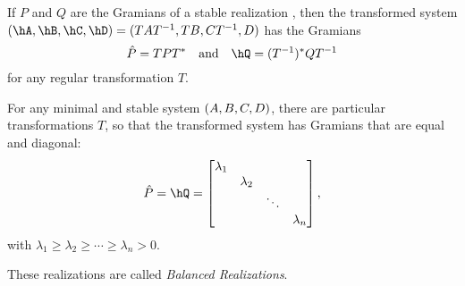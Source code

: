 If $P$ and $Q$ are the Gramians of a stable realization \abcdsys, then the transformed system $\rabcdsys=\abcdsyst$ has the Gramians 
\begin{equation*}
	\hat P = TPT^* \quad \text{and} \quad \hQ = (T^{-1})^*QT^{-1}
\end{equation*}
for any regular transformation $T$.

For any minimal and stable system $(A,B,C,D)$, there are particular transformations $T$, so that the transformed system has Gramians that are equal and diagonal:
\begin{equation*}
	\hat P = \hQ =
	\begin{bmatrix}
		\lambda_1 & & & \\
		& \lambda_2 & & \\
		& & \ddots & \\
		& & & \lambda_n \\
	\end{bmatrix},
\end{equation*}
with $\lambda_1 \geq \lambda_2 \geq \dotsm \geq \lambda_n > 0$.

These realizations are called \emph{Balanced Realizations}.

